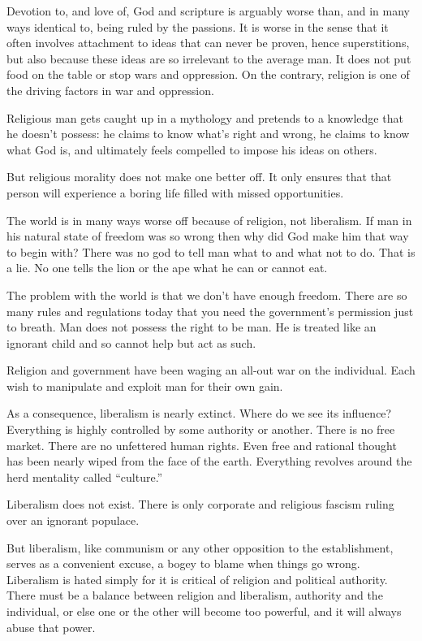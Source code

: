 \begin{footnotesize}
\begin{sffamily}
Devotion to, and love of, God and scripture is arguably worse than, and in many ways identical to, being ruled by the passions. It is worse in the sense that it often involves attachment to ideas that can never be proven, hence superstitions, but also because these ideas are so irrelevant to the average man. It does not put food on the table or stop wars and oppression. On the contrary, religion is one of the driving factors in war and oppression.

Religious man gets caught up in a mythology and pretends to a knowledge that he doesn't possess: he claims to know what's right and wrong, he claims to know what God is, and ultimately feels compelled to impose his ideas on others.

But religious morality does not make one better off. It only ensures that that person will experience a boring life filled with missed opportunities.

The world is in many ways worse off because of religion, not liberalism. If man in his natural state of freedom was so wrong then why did God make him that way to begin with? There was no god to tell man what to and what not to do. That is a lie. No one tells the lion or the ape what he can or cannot eat.

The problem with the world is that we don't have enough freedom. There are so many rules and regulations today that you need the government's permission just to breath. Man does not possess the right to be man. He is treated like an ignorant child and so cannot help but act as such.

Religion and government have been waging an all-out war on the individual. Each wish to manipulate and exploit man for their own gain.

As a consequence, liberalism is nearly extinct. Where do we see its influence? Everything is highly controlled by some authority or another. There is no free market. There are no unfettered human rights. Even free and rational thought has been nearly wiped from the face of the earth. Everything revolves around the herd mentality called ``culture.''

Liberalism does not exist. There is only corporate and religious fascism ruling over an ignorant populace.

But liberalism, like communism or any other opposition to the establishment, serves as a convenient excuse, a bogey to blame when things go wrong. Liberalism is hated simply for it is critical of religion and political authority. There must be a balance between religion and liberalism, authority and the individual, or else one or the other will become too powerful, and it will always abuse that power.


\end{sffamily}
\end{footnotesize}
